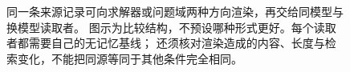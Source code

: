 \begin{figure}[htbp]
\centering

\caption{同一条来源记录可向求解器或问题域两种方向渲染，再交给同模型与换模型读取者。
图示为比较结构，不预设哪种形式更好。每个读取者都需要自己的无记忆基线；
还须核对渲染造成的内容、长度与检索变化，不能把同源等同于其他条件完全相同。}
\label{fig:ch05-fit}
\end{figure}
